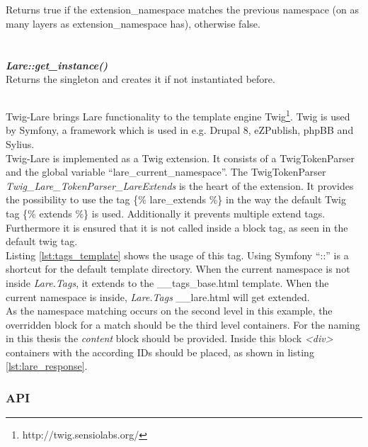 \\
\\
Returns true if the extension\_namespace matches the previous namespace (on as many layers as extension\_namespace has), otherwise false.
\\
\\
\\
\large{\textbf{\textit{Lare::get\_instance()}}}
\\
Returns the \lare{} singleton and creates it if not instantiated before.

\subsection{\twigLare{}}
Twig-Lare brings Lare functionality to the template engine Twig\footnote{http://twig.sensiolabs.org/}.
Twig is used by Symfony, a framework which is used in e.g. Drupal 8, eZPublish, phpBB and Sylius.
\\
Twig-Lare is implemented as a Twig extension.
It consists of a TwigTokenParser and the global variable \enquote{lare\_current\_namespace}.
The TwigTokenParser \emph{Twig\_Lare\_TokenParser\_LareExtends} is the heart of the extension.
It provides the possibility to use the tag \{\% lare\_extends \%\} in the way the default Twig tag \{\% extends \%\} is used.
Additionally it prevents multiple extend tags.
Furthermore it is ensured that it is not called inside a block tag, as seen in the default twig tag.
\\
Listing \ref{lst:tags_template} shows the usage of this tag.
Using Symfony \enquote{::} is a shortcut for the default template directory.
When the current namespace is not inside \emph{Lare.Tags}, it extends to the \_\_tags\_base.html template.
When the current namespace is inside, \emph{Lare.Tags} \_\_lare.html will get extended.
\\
As the namespace matching occurs on the second level in this example, the overridden block for a match should be the third level containers.
For the naming in this thesis the \emph{content} block should be provided.
Inside this block \emph{<div>} containers with the according IDs should be placed, as shown in listing \ref{lst:lare_response}.

\subsubsection{API}

